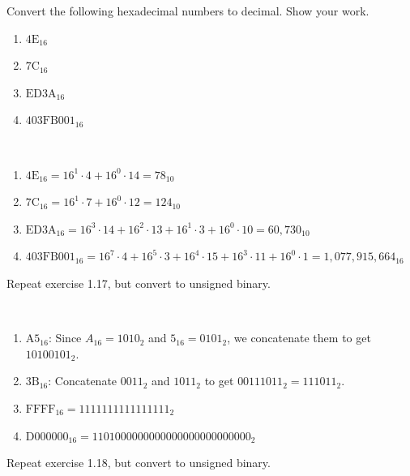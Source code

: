 \documentclass[12pt]{article}
\newenvironment{ex}[2][Exercise]{\begin{trivlist}
		\item[\hskip \labelsep {\bfseries #1}\hskip \labelsep {\bfseries #2.}]}{\end{trivlist}}
\newenvironment{sol}[1][Solution]{\begin{trivlist}
		\item[\hskip \labelsep {\bfseries #1:}]}{\end{trivlist}}
\begin{document}
\begin{ex}{1.18} Convert the following hexadecimal numbers to decimal. Show your work.
	\begin{enumerate}[label=(\alph*)]
		\item $\text{4E}_{16}$
		\item $\text{7C}_{16}$
		\item $\text{ED3A}_{16}$
		\item $\text{403FB001}_{16}$
	\end{enumerate}
\end{ex}

\begin{sol}\
	\begin{enumerate}[label=(\alph*)]
		\item $\text{4E}_{16}=16^{1}\cdot 4+16^{0}\cdot 14=78_{10}$
		\item $\text{7C}_{16}=16^1\cdot 7+16^{0}\cdot 12=124_{10}$
		\item $\text{ED3A}_{16}=16^{3}\cdot 14+16^{2}\cdot 13+16^{1}\cdot 3+16^{0}\cdot 10=60,730_{10}$
		\item $\text{403FB001}_{16}=16^7\cdot 4+16^5\cdot 3+16^4\cdot 15+16^3\cdot 11+16^0\cdot 1=1,077,915,664_{16}$
	\end{enumerate}
\end{sol}

\begin{ex}{1.19} Repeat exercise 1.17, but convert to unsigned binary.
\end{ex}

\begin{sol}\
	\begin{enumerate}[label=(\alph*)]
		\item $\text{A5}_{16}$: Since $A_{16}=1010_{2}$ and $5_{16}=0101_{2}$, we concatenate them to get $10100101_2$.
		\item $\text{3B}_{16}$: Concatenate $0011_2$ and $1011_2$ to get $00111011_2=111011_2$.
		\item $\text{FFFF}_{16}=1111111111111111_2$
		\item $\text{D000000}_{16}=1101000000000000000000000000_2$
\end{enumerate}
\end{sol}

\begin{ex}{1.20} Repeat exercise 1.18, but convert to unsigned binary.
\end{ex}
\end{document}
